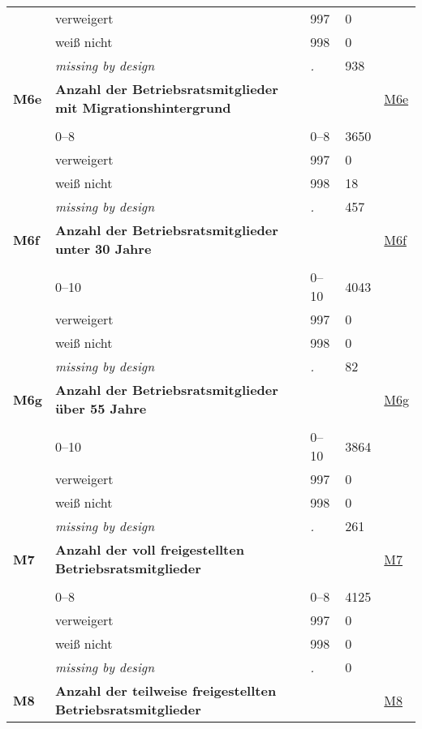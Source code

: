 \begin{longtable}{| L{2.65cm} | L{8cm} | C{1.5cm} | R{1.25cm} | C{2.25cm}  |}
   & verweigert & 997 & 0 &  \\ 
   & weiß nicht & 998 & 0 &  \\ 
   & \textit{missing by design} & \textit{.} & 938 &  \\ 
   \midrule
\textbf{M6e}\label{var:M6e} & \textbf{Anzahl der Betriebsratsmitglieder mit Migrationshintergrund} &  &  & \hyperref[M6e]{M6e} \\ 
   &  &  &  &  \\ 
   & 0--8 & 0--8 & 3650 &  \\ 
   & verweigert & 997 & 0 &  \\ 
   & weiß nicht & 998 & 18 &  \\ 
   & \textit{missing by design} & \textit{.} & 457 &  \\ 
   \midrule
\textbf{M6f}\label{var:M6f} & \textbf{Anzahl der Betriebsratsmitglieder unter 30 Jahre} &  &  & \hyperref[M6f]{M6f} \\ 
   &  &  &  &  \\ 
   & 0--10 & 0--10 & 4043 &  \\ 
   & verweigert & 997 & 0 &  \\ 
   & weiß nicht & 998 & 0 &  \\ 
   & \textit{missing by design} & \textit{.} & 82 &  \\ 
   \midrule
\textbf{M6g}\label{var:M6g} & \textbf{Anzahl der Betriebsratsmitglieder über 55 Jahre} &  &  & \hyperref[M6g]{M6g} \\ 
   &  &  &  &  \\ 
   & 0--10 & 0--10 & 3864 &  \\ 
   & verweigert & 997 & 0 &  \\ 
   & weiß nicht & 998 & 0 &  \\ 
   & \textit{missing by design} & \textit{.} & 261 &  \\ 
   \midrule
\textbf{M7}\label{var:M7} & \textbf{Anzahl der voll freigestellten Betriebsratsmitglieder} &  &  & \hyperref[M7]{M7} \\ 
   &  &  &  &  \\ 
   & 0--8 & 0--8 & 4125 &  \\ 
   & verweigert & 997 & 0 &  \\ 
   & weiß nicht & 998 & 0 &  \\ 
   & \textit{missing by design} & \textit{.} & 0 &  \\ 
   \midrule
\textbf{M8}\label{var:M8} & \textbf{Anzahl der teilweise freigestellten Betriebsratsmitglieder} &  &  & \hyperref[M8]{M8} \\ 

\end{longtable}
